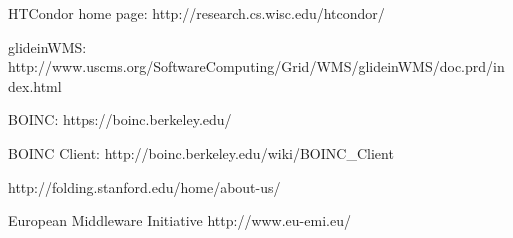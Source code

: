 \begin{thebibliography}{99}
 HTCondor home page: http://research.cs.wisc.edu/htcondor/

 glideinWMS: http://www.uscms.org/SoftwareComputing/Grid/WMS/glideinWMS/doc.prd/index.html

 BOINC: https://boinc.berkeley.edu/

 BOINC Client: http://boinc.berkeley.edu/wiki/BOINC\_Client

 http://folding.stanford.edu/home/about-us/

 European Middleware Initiative http://www.eu-emi.eu/
\end{thebibliography}
